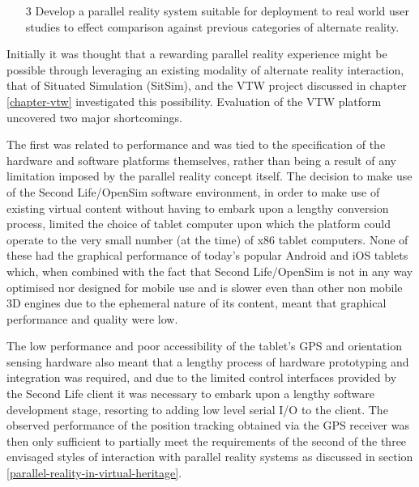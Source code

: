 \begin{enumerate}
	\item[3] Develop a parallel reality system suitable for deployment to real world user studies to effect comparison against previous categories of alternate reality.
\end{enumerate}

Initially it was thought that a rewarding parallel reality experience might be possible through leveraging an existing modality of alternate reality interaction, that of Situated Simulation (SitSim), and the VTW project discussed in chapter \ref{chapter-vtw} investigated this possibility. Evaluation of the VTW platform uncovered two major shortcomings.

The first was related to performance and was tied to the specification of the hardware and software platforms themselves, rather than being a result of any limitation imposed by the parallel reality concept itself. The decision to make use of the Second Life/OpenSim software environment, in order to make use of existing virtual content without having to embark upon a lengthy conversion process, limited the choice of tablet computer upon which the platform could operate to the very small number (at the time) of x86 tablet computers. None of these had the graphical performance of today's popular Android and iOS tablets which, when combined with the fact that Second Life/OpenSim is not in any way optimised nor designed for mobile use and is slower even than other non mobile 3D engines due to the ephemeral nature of its content, meant that graphical performance and quality were low.

The low performance and poor accessibility of the tablet's GPS and orientation sensing hardware also meant that a lengthy process of hardware prototyping and integration was required, and due to the limited control interfaces provided by the Second Life client it was necessary to embark upon a lengthy software development stage, resorting to adding low level serial I/O to the client. The observed performance of the position tracking obtained via the GPS receiver was then only sufficient to partially meet the requirements of the second of the three envisaged styles of interaction with parallel reality systems as discussed in section \ref{parallel-reality-in-virtual-heritage}.

